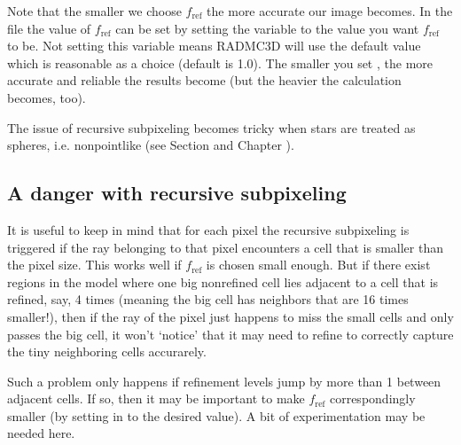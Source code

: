 \documentclass[letterpaper,10pt,english]{sphinxmanual}
\begin{document}
Note that the smaller we choose \(f_{\mathrm{ref}}\) the more accurate our
image becomes. In the  file the value of \(f_{\mathrm{ref}}\)
can be set by setting the variable  to the
value you want \(f_{\mathrm{ref}}\) to be. Not setting this variable means
RADMC\sphinxhyphen{}3D will use the default value which is reasonable as a choice (default
is 1.0). The smaller you set , the
more accurate and reliable the results become (but the heavier the calculation
becomes, too).

 The issue of recursive sub\sphinxhyphen{}pixeling becomes tricky when stars
are treated as spheres, i.e. non\sphinxhyphen{}point\sphinxhyphen{}like (see Section
{\hyperref[\detokenize{imagesspectra:sec-image-stars}]{}} and Chapter {\hyperref[\detokenize{stars:chap-stars}]{}}).


\subsection{A danger with recursive sub\sphinxhyphen{}pixeling}
\label{\detokenize{imagesspectra:a-danger-with-recursive-sub-pixeling}}
It is useful to keep in mind that for each pixel the recursive sub\sphinxhyphen{}pixeling
is triggered if the ray belonging to that pixel encounters a cell that is
smaller than the pixel size. This  works well if
\(f_{\mathrm{ref}}\) is chosen small enough. But if there exist regions in the
model where one big non\sphinxhyphen{}refined cell lies adjacent to a cell that is
refined, say, 4 times (meaning the big cell has neighbors that are 16 times
smaller!), then if the ray of the pixel just happens to miss the small cells
and only passes the big cell, it won’t ‘notice’ that it may need to refine
to correctly capture the tiny neighboring cells accurarely.

Such a problem only happens if refinement levels jump by more than 1 between
adjacent cells. If so, then it may be important to make \(f_{\mathrm{ref}}\)
correspondingly smaller (by setting  in
 to the desired value). A bit of experimentation may
be needed here.
\end{document}
